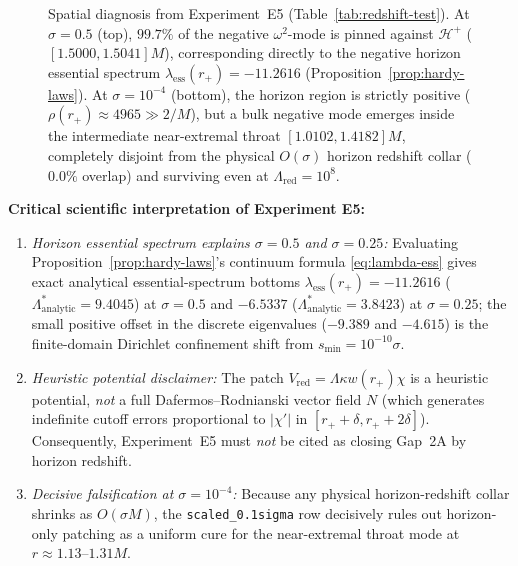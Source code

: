 \documentclass[11pt, a4paper]{article}
\theoremstyle{remark}
\begin{document}
\begin{figure}[h]
\caption{Spatial diagnosis from Experiment~E5 (Table~\ref{tab:redshift-test}). At $\sigma = 0.5$ (top), $99.7\%$ of the negative $\omega^2$-mode is pinned against $\mathcal{H}^+$ ($[1.5000, 1.5041]M$), corresponding directly to the negative horizon essential spectrum $\lambda_{\mathrm{ess}}(r_+) = -11.2616$ (Proposition~\ref{prop:hardy-laws}). At $\sigma = 10^{-4}$ (bottom), the horizon region is strictly positive ($\rho(r_+) \approx 4965 \gg 2/M$), but a bulk negative mode emerges inside the intermediate near-extremal throat $[1.0102, 1.4182]M$, completely disjoint from the physical $O(\sigma)$ horizon redshift collar ($0.0\%$ overlap) and surviving even at $\Lambda_{\mathrm{red}} = 10^8$.}
\label{fig:localization}
\end{figure}

\textbf{Critical scientific interpretation of Experiment E5:}
\begin{enumerate}
\item \emph{Horizon essential spectrum explains $\sigma = 0.5$ and $\sigma = 0.25$:} Evaluating Proposition~\ref{prop:hardy-laws}'s continuum formula \eqref{eq:lambda-ess} gives exact analytical essential-spectrum bottoms $\lambda_{\mathrm{ess}}(r_+) = -11.2616$ ($\Lambda_{\mathrm{analytic}}^* = 9.4045$) at $\sigma = 0.5$ and $-6.5337$ ($\Lambda_{\mathrm{analytic}}^* = 3.8423$) at $\sigma = 0.25$; the small positive offset in the discrete eigenvalues ($-9.389$ and $-4.615$) is the finite-domain Dirichlet confinement shift from $s_{\min} = 10^{-10}\sigma$.
\item \emph{Heuristic potential disclaimer:} The patch $V_{\mathrm{red}} = \Lambda\kappa w(r_+)\chi$ is a heuristic potential, \emph{not} a full Dafermos--Rodnianski vector field $N$ (which generates indefinite cutoff errors proportional to $|\chi'|$ in $[r_+ + \delta, r_+ + 2\delta]$). Consequently, Experiment~E5 must \emph{not} be cited as closing Gap~2A by horizon redshift.
\item \emph{Decisive falsification at $\sigma = 10^{-4}$:} Because any physical horizon-redshift collar shrinks as $O(\sigma M)$, the \texttt{scaled\_0.1sigma} row decisively rules out horizon-only patching as a uniform cure for the near-extremal throat mode at $r \approx 1.13\text{--}1.31M$.
\end{enumerate}
\end{document}
